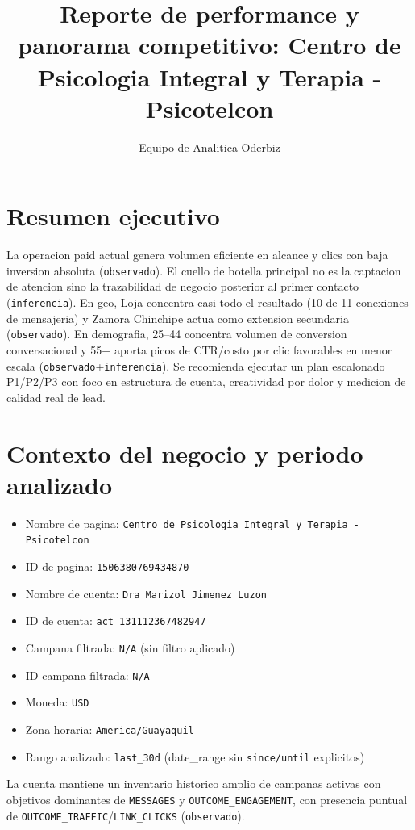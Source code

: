 \documentclass[9pt,a4paper,twocolumn,twoside]{tau-class/tau}
\title{Reporte de performance y panorama competitivo: Centro de Psicologia Integral y Terapia - Psicotelcon}
\author[a,1]{Equipo de Analitica Oderbiz}
\affil[a]{Unidad de Inteligencia Comercial}
\begin{document}
\maketitle
\thispagestyle{firststyle}

\section{Resumen ejecutivo}

La operacion paid actual genera volumen eficiente en alcance y clics con baja inversion absoluta (\texttt{observado}). El cuello de botella principal no es la captacion de atencion sino la trazabilidad de negocio posterior al primer contacto (\texttt{inferencia}). En geo, Loja concentra casi todo el resultado (10 de 11 conexiones de mensajeria) y Zamora Chinchipe actua como extension secundaria (\texttt{observado}). En demografia, 25--44 concentra volumen de conversion conversacional y 55+ aporta picos de CTR/costo por clic favorables en menor escala (\texttt{observado}+\texttt{inferencia}). Se recomienda ejecutar un plan escalonado P1/P2/P3 con foco en estructura de cuenta, creatividad por dolor y medicion de calidad real de lead.

\section{Contexto del negocio y periodo analizado}

\begin{itemize}
  \item Nombre de pagina: \texttt{Centro de Psicologia Integral y Terapia - Psicotelcon}
  \item ID de pagina: \texttt{1506380769434870}
  \item Nombre de cuenta: \texttt{Dra Marizol Jimenez Luzon}
  \item ID de cuenta: \texttt{act\_131112367482947}
  \item Campana filtrada: \texttt{N/A} (sin filtro aplicado)
  \item ID campana filtrada: \texttt{N/A}
  \item Moneda: \texttt{USD}
  \item Zona horaria: \texttt{America/Guayaquil}
  \item Rango analizado: \texttt{last\_30d} (date\_range sin \texttt{since/until} explicitos)
\end{itemize}

La cuenta mantiene un inventario historico amplio de campanas activas con objetivos dominantes de \texttt{MESSAGES} y \texttt{OUTCOME\_ENGAGEMENT}, con presencia puntual de \texttt{OUTCOME\_TRAFFIC}/\texttt{LINK\_CLICKS} (\texttt{observado}).
\end{document}
